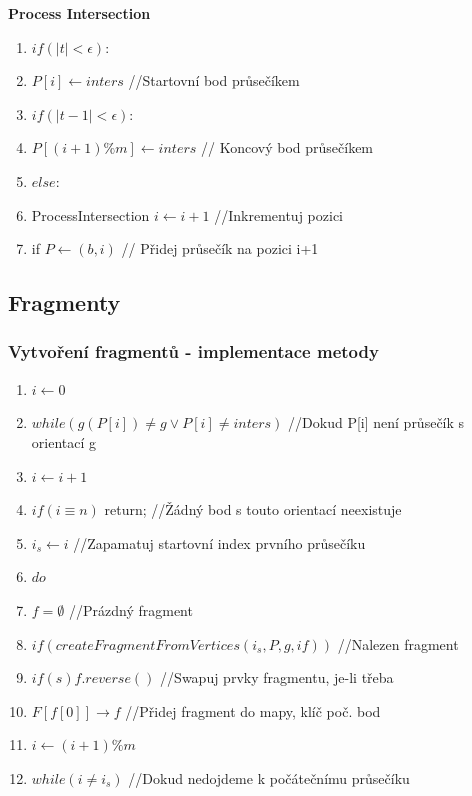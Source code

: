 \documentclass[a4paper, 12pt]{article}
\begin{document}
\vspace{1cm}

\textbf{Process Intersection} 
\begin{enumerate}
	\item $ if (|t| < \epsilon): $ 
	\item \hspace {1cm} $ P[i] \longleftarrow inters $  //Startovní bod průsečíkem
	\item  $ if (|t-1| < \epsilon): $
	\item \hspace {1cm}  $ P[(i+1)\%m] \longleftarrow inters$ // Koncový bod průsečíkem
	\item  $ else:$
	\item \hspace {1cm} ProcessIntersection $ i \longleftarrow i+1 $ //Inkrementuj pozici
	\item \hspace {1cm} if $P \longleftarrow  (b,i)$ // Přidej průsečík na pozici i+1
\end{enumerate}

\clearpage

\subsection{Fragmenty}

\subsubsection{Vytvoření fragmentů - implementace metody}
\begin{enumerate}
	\item $ i \longleftarrow 0 $
	\item $ while (g(P[i]) \neq g \vee P[i] \neq inters) $ //Dokud P[i] není průsečík s orientací g
	\item \hspace{1cm} $ i \longleftarrow i+1 $
	\item $ if (i\equiv n) $ return; //Žádný bod s touto orientací neexistuje
	\item $ i_s \longleftarrow i $ //Zapamatuj startovní index prvního průsečíku
	\item $ do $
	\item \hspace{1cm} $ f = \emptyset $ //Prázdný fragment
	\item \hspace{1cm} $ if (createFragmentFromVertices (i_s, P, g, i f)) $ //Nalezen fragment
	\item \hspace{2cm} $ if (s) f.reverse() $ //Swapuj prvky fragmentu, je-li třeba
	\item \hspace{2cm} $ F[f[0]] \longrightarrow f $ //Přidej fragment do mapy, klíč poč. bod
	\item \hspace{1cm} $ i \longleftarrow (i+1)\%m $
	\item $ while (i \neq i_s) $ //Dokud nedojdeme k počátečnímu průsečíku
\end{enumerate}
\end{document}
